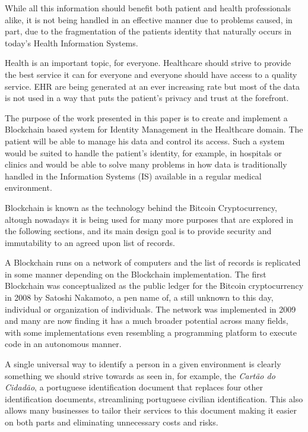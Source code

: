 \documentclass[]{llncs}
\begin{document}
While all this information should benefit both patient and health professionals
alike, it is not being handled in an effective manner due to problems caused,
in part, due to the fragmentation of the patients identity that naturally
occurs in today's Health Information Systems.

Health is an important topic, for everyone. Healthcare should strive to provide
the best service it can for everyone and everyone should have access to a
quality service. EHR are being generated at an ever increasing rate but most of
the data is not used in a way that puts the patient's privacy and trust at the
forefront.

The purpose of the work presented in this paper is to create and implement a
Blockchain based system for Identity Management in the Healthcare domain. The
patient will be able to manage his data and control its access. Such a system
would be suited to handle the patient’s identity, for example, in hospitals or
clinics and would be able to solve many problems in how data is traditionally
handled in the Information Systems (IS) available in a regular medical
environment.

Blockchain is known as the technology behind the Bitcoin Cryptocurrency,
altough nowadays it is being used for many more purposes that are explored in
the following sections, and its main design goal is to provide security and
immutability to an agreed upon list of records.

A Blockchain runs on a network of computers and the list of records is
replicated in some manner depending on the Blockchain implementation. The first
Blockchain was conceptualized as the public ledger for the Bitcoin
cryptocurrency in 2008 by Satoshi Nakamoto, a pen name of, a still unknown to
this day, individual or organization of individuals.  The network was
implemented in 2009 and many are now finding it has a much broader potential
across many fields, with some implementations even resembling a programming
platform to execute code in an autonomous manner.  \cite{Nakamoto2008}

A single universal way to identify a person in a given environment is clearly
something we should strive towards as seen in, for example, the \textit{Cartão
do Cidadão}, a portuguese identification document that replaces four other
identification documents, streamlining portuguese civilian identification.
This also allows many businesses to tailor their services to this document
making it easier on both parts and eliminating unnecessary costs and risks.
\end{document}
